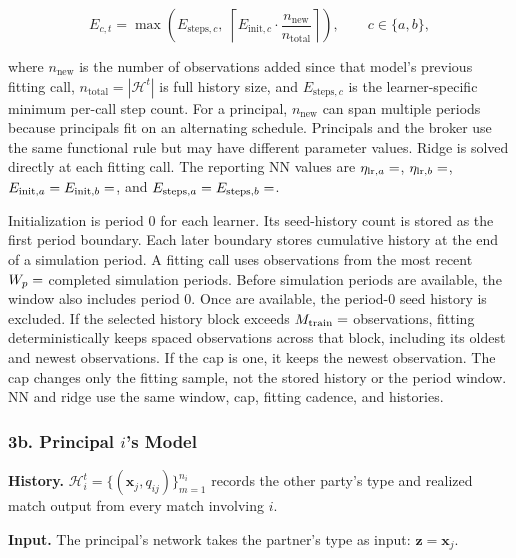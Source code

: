 \documentclass[11pt]{article}
\begin{document}
\[E_{c,t} = \max\!\left(E_{\text{steps},c}, \; \left\lceil E_{\text{init},c} \cdot \frac{n_{\text{new}}}{n_{\text{total}}} \right\rceil\right), \qquad c\in\{a,b\},\]

where \(n_{\text{new}}\) is the number of observations added since that model's previous fitting call, \(n_{\text{total}} = |\mathcal{H}^t|\) is full history size, and \(E_{\text{steps},c}\) is the learner-specific minimum per-call step count. For a principal, \(n_{\text{new}}\) can span multiple periods because principals fit on an alternating schedule. Principals and the broker use the same functional rule but may have different parameter values. Ridge is solved directly at each fitting call. The reporting NN values are \(\eta_{\mathrm{lr},a}=\pv{settingeta_lr_agent}\), \(\eta_{\mathrm{lr},b}=\pv{settingeta_lr_broker}\), \(E_{\mathrm{init},a}=E_{\mathrm{init},b}=\pv{settingE_init_broker}\), and \(E_{\mathrm{steps},a}=E_{\mathrm{steps},b}=\pv{settingtrain_steps_broker}\).

Initialization is period 0 for each learner. Its seed-history count is stored as the first period boundary. Each later boundary stores cumulative history at the end of a simulation period. A fitting call uses observations from the most recent \(W_p = \pv{settingtrain_window_periods}\) completed simulation periods. Before  simulation periods are available, the window also includes period 0. Once  are available, the period-0 seed history is excluded. If the selected history block exceeds \(M_{\text{train}} = \pv{settingtrain_max_obs}\) observations, fitting deterministically keeps  spaced observations across that block, including its oldest and newest observations. If the cap is one, it keeps the newest observation. The cap changes only the fitting sample, not the stored history or the period window. NN and ridge use the same window, cap, fitting cadence, and histories.

\subsubsection{\texorpdfstring{3b. Principal \(i\)'s Model}{3b. Principal i's Model}}\label{b.-agent-is-model}

\textbf{History.} \(\mathcal{H}_i^t = \{(\mathbf{x}_j, q_{ij})\}_{m=1}^{n_i}\) records the other party's type and realized match output from every match involving \(i\).

\textbf{Input.} The principal's network takes the partner's type as input: \(\mathbf{z} = \mathbf{x}_j\).
\end{document}
